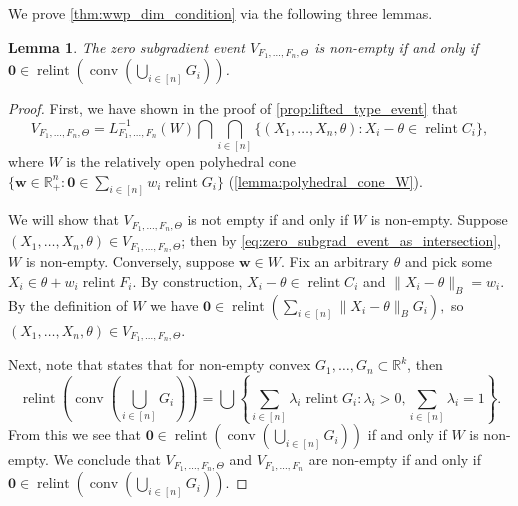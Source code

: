 \documentclass[10pt]{article}
\newtheorem{lemma}[theorem]{Lemma}
\theoremstyle{definition}
\theoremstyle{remark}
\newcommand{\R}{\mathbb{R}}
\newcommand{\CType}{F_1,\dots,F_n}
\newcommand{\sample}{ X_1,\dots, X_n}
\DeclareMathOperator{\conv}{conv}
\DeclareMathOperator{\relint}{relint}
\renewcommand{\vec}[1]{\mathbf{#1}}
\begin{document}
	We prove \cref{thm:wwp_dim_condition} via the following three lemmas.
	
	\begin{lemma}\label{lemma:possible}
		The zero subgradient event $V_{\CType,\Theta}$ is non-empty if and only if $\vec 0 \in \relint \left( \conv \left(\textstyle \bigcup_{i \in [n]} G_i \right) \right)$.
	\end{lemma}
	
	\begin{proof}
		First, we have shown in the proof of \cref{prop:lifted_type_event} that
		\begin{equation}
			V_{\CType, \Theta} = L_{\CType}^{-1}(W) \textstyle \bigcap \bigcap_{i \in [n]} \{ (\sample, \theta) : X_i - \theta \in \relint C_i \},\label{eq:zero_subgrad_event_as_intersection}
		\end{equation}
		where $W$ is the relatively open polyhedral cone $\{\vec w \in \R^n_{+} : \vec 0 \in \sum_{i \in [n]} w_i \relint G_i\}$ (\cref{lemma:polyhedral_cone_W}). 
		
		We will show that $V_{\CType,\Theta}$ is not empty if and only if $W$ is non-empty. Suppose $(X_1,\dots, X_n,\theta) \in V_{\CType,\Theta}$; then by \cref{eq:zero_subgrad_event_as_intersection}, $W$ is non-empty. Conversely, suppose $\vec w \in W$. Fix an arbitrary $\theta$ and pick some $X_i \in \theta + w_i \relint F_i$. By construction, $X_i - \theta \in \relint C_i$ and $\| X_i - \theta \|_B = w_i$. By the definition of $W$ we have $
		\vec 0 \in \relint \left( \textstyle \sum_{i \in [n]} \| X_i - \theta \|_B G_i \right),
		$ so $(\sample,\theta) \in V_{\CType,\Theta}$.
		
		Next, note that \cite[Theorem 6.9]{rockafellar1970convex} states that for non-empty convex $G_1, \dots, G_n \subset \R^k$, then
		\begin{equation}\label{eq:rockafellar_thm6.9}
			\relint \left( \conv \left( \textstyle \bigcup_{i \in [n]} G_i \right) \right) = \bigcup \left \{ \textstyle \sum_{i \in [n]} \lambda_i \relint G_i : \lambda_i > 0, \sum_{i \in [n]} \lambda_i = 1 \right \}.
		\end{equation}
		From this we see that $\vec 0 \in \relint \left( \conv \left(\textstyle \bigcup_{i \in [n]} G_i \right) \right)$ if and only if $W$ is non-empty. We conclude that $V_{\CType, \Theta}$ and $V_{\CType}$ are non-empty if and only if $\vec 0 \in \relint \left( \conv \left(\textstyle \bigcup_{i \in [n]} G_i \right) \right)$.
	\end{proof}
	
\end{document}
